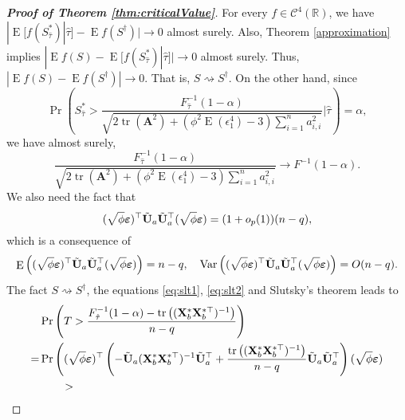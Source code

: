 \documentclass[11pt]{article}
\DeclareMathOperator{\mytr}{tr}
\DeclareMathOperator{\myE}{E}
\DeclareMathOperator{\myVar}{Var}
\newcommand{\BA}{\mathbf{A}}    \newcommand{\BB}{\mathbf{B}}    \newcommand{\BC}{\mathbf{C}}    \newcommand{\BD}{\mathbf{D}}    \newcommand{\BE}{\mathbf{E}}    \newcommand{\BF}{\mathbf{F}}    \newcommand{\BG}{\mathbf{G}}    \newcommand{\BH}{\mathbf{H}}    \newcommand{\BI}{\mathbf{I}}    \newcommand{\BJ}{\mathbf{J}}    \newcommand{\BK}{\mathbf{K}}    \newcommand{\BL}{\mathbf{L}}
\theoremstyle{plain}
\theoremstyle{definition}
\theoremstyle{remark}
\begin{document}
\begin{proof}[\textbf{Proof of Theorem \ref{thm:criticalValue}}]
    For every $f\in \mathscr C^4 (\mathbb R)$,
    we have $| \myE [f(S^*_{\hat \tau}) |\hat\tau] - \myE f(S^\dagger) |\to 0$ almost surely.
    Also, Theorem \ref{approximation} implies
        $|\myE f(S)- \myE [f(S^*_{\hat \tau})|\hat\tau] |\to 0$ almost surely.
        Thus, $|\myE f(S)- \myE f(S^\dagger) |\to 0$.
        That is, $S\rightsquigarrow S^\dagger$.
        On the other hand, since
    \begin{equation*}
        \Pr\left(
            S_{\hat \tau}^*
            >
            \frac{F^{-1}_{\hat \tau} (1-\alpha)}{
            \sqrt{
    2 \mytr(\BA^2)
    +
    ( \phi^2 \myE (\epsilon_1^4)-3) \sum_{i=1}^n a_{i,i}^2
            }             
    }
\Bigg | \hat{\tau} \right)=\alpha,
    \end{equation*}
    we have almost surely,
    \begin{equation}\label{eq:slt1}
            \frac{F^{-1}_{\hat \tau} (1-\alpha)}{
            \sqrt{
    2 \mytr(\BA^2)
    +
    ( \phi^2 \myE (\epsilon_1^4)-3) \sum_{i=1}^n a_{i,i}^2
            }             
    }
    \to F^{-1}(1-\alpha).
    \end{equation}
We also need the fact that
\begin{equation}
    (\sqrt \phi \boldsymbol{\varepsilon})^\top 
    \tilde {\mathbf{U}}_a \tilde {\mathbf{U}}_a^\top
(\sqrt \phi \boldsymbol{\varepsilon})
=
(1+o_p(1))(n-q),
    \label{eq:slt2}
\end{equation}
which is a consequence of
\begin{equation*}
    \myE\left(  (\sqrt \phi \bepsilon)^\top 
    \tilde \BU_a \tilde \BU_a^\top
(\sqrt \phi \bepsilon)
\right)
=n-q
,\quad
    \myVar\left(  (\sqrt \phi \bepsilon)^\top 
    \tilde \BU_a \tilde \BU_a^\top
(\sqrt \phi \bepsilon)
\right)
=O(n-q)
    .
\end{equation*}
The fact $S\rightsquigarrow S^\dagger$, the equations \eqref{eq:slt1}, \eqref{eq:slt2} and Slutsky's theorem leads to
\begin{align*}
            &\Pr\left( T > \frac{F^{-1}_{\hat \tau} (1-\alpha)-\mytr\left( (\BX_b^* \BX_b^{*\top})^{-1}  \right)}{n-q} \right)
            \\
            =&\Pr
            \Bigg( 
                (\sqrt \phi \bepsilon)^\top \left( -  \tilde \BU_a (\BX_b^* \BX_b^{*\top})^{-1} \tilde \BU_a^\top 
            +\frac{
\mytr\left( (\BX_b^* \BX_b^{*\top})^{-1}  \right)
}{n-q}
\tilde \BU_a  \tilde \BU_a^\top
 \right) 
(\sqrt \phi \bepsilon)
            \\
            &
            \quad
            \quad
            >

\end{align*}
\end{proof}
\end{document}
